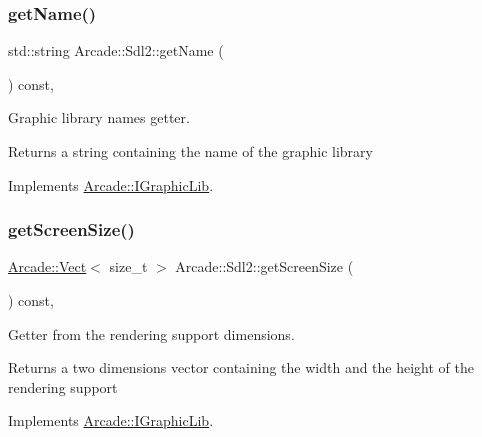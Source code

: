 \subsubsection{\texorpdfstring{get\+Name()}{getName()}}
{\footnotesize\ttfamily std\+::string Arcade\+::\+Sdl2\+::get\+Name (\begin{DoxyParamCaption}{ }\end{DoxyParamCaption}) const\hspace{0.3cm}{\ttfamily [final]}, {\ttfamily [virtual]}}



Graphic library name\textquotesingle{}s getter. 

\begin{DoxyReturn}{Returns}
a string containing the name of the graphic library 
\end{DoxyReturn}


Implements \hyperlink{class_arcade_1_1_i_graphic_lib_aecc266c4ac10f07f4cdca023e74e843d}{Arcade\+::\+I\+Graphic\+Lib}.

\mbox{\label{class_arcade_1_1_sdl2_ae54d60076b915de4fce36ace576ea01d}} 
\subsubsection{\texorpdfstring{get\+Screen\+Size()}{getScreenSize()}}
{\footnotesize\ttfamily \hyperlink{class_arcade_1_1_vect}{Arcade\+::\+Vect}$<$ size\+\_\+t $>$ Arcade\+::\+Sdl2\+::get\+Screen\+Size (\begin{DoxyParamCaption}{ }\end{DoxyParamCaption}) const\hspace{0.3cm}{\ttfamily [final]}, {\ttfamily [virtual]}}



Getter from the rendering support dimensions. 

\begin{DoxyReturn}{Returns}
a two dimensions vector containing the width and the height of the rendering support 
\end{DoxyReturn}


Implements \hyperlink{class_arcade_1_1_i_graphic_lib_a0ce5eb4661d55b6e729fc1c16566dd9f}{Arcade\+::\+I\+Graphic\+Lib}.

\mbox{\label{class_arcade_1_1_sdl2_a44772ea99509adde0a1c8779265ce260}} 
